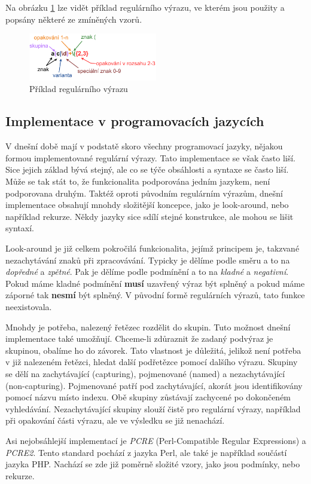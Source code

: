 Na obrázku \ref{fig:REGEXEXMP} lze vidět příklad regulárního výrazu, ve kterém jsou použity a popsány některé ze zmíněných vzorů.

\begin{figure}[!h]
	\centering
	\includegraphics[width=0.5\textwidth]{Figures/regex_exmp.pdf}
	\caption{Příklad regulárního výrazu}
	\label{fig:REGEXEXMP}
\end{figure}

\subsection*{Implementace v programovacích jazycích}\label{sec:impipl}

V dnešní době mají v podstatě skoro všechny programovací jazyky, nějakou formou implementované regulární výrazy.
Tato implementace se však často liší. 
Sice jejich základ bývá stejný, ale co se týče obsáhlosti a syntaxe se často liší.
Může se tak stát to, že funkcionalita podporována jedním jazykem, není podporovana druhým.
Taktéž oproti původním regulárním výrazům, dnešní implementace obsahují mnohdy složitější koncepce, jako je look-around, nebo například rekurze.
Někdy jazyky sice sdílí stejné konstrukce, ale mohou se lišit syntaxí.

Look-around je již celkem pokročilá funkcionalita, jejímž principem je, takzvané nezachytávání znaků při zpracovávání.
Typicky je dělíme podle směru a to na \textit{dopředné} a \textit{zpětné}.
Pak je dělíme podle podmínění a to na \textit{kladné} a \textit{negativní}.
Pokud máme kladné podmínění \textbf{musí} uzavřený výraz být splněný a pokud máme záporné tak \textbf{nesmí} být splněný.
V původní formě regulárních výrazů, tato funkce neexistovala.

Mnohdy je potřeba, nalezený řetězec rozdělit do skupin. 
Tuto možnost dnešní implementace také umožňují.
Chceme-li zdůraznit že zadaný podvýraz je skupinou, obalíme ho do závorek.
Tato vlastnost je důležitá, jelikož není potřeba v již nalezeném řetězci, hledat další podřetězce pomocí dalšího výrazu.
Skupiny se dělí na zachytávající (capturing), pojmenované (named) a nezachytávající (non-capturing).
Pojmenované patří pod zachytávající, akorát jsou identifikovány pomocí názvu místo indexu.
Obě skupiny zůstávají zachycené po dokončeném vyhledávání.
Nezachytávající skupiny slouží čistě pro regulární výrazy, například při opakování části výrazu, ale ve výsledku se již nenachází.

Asi nejobsáhlejší implementací je \textit{PCRE} (Perl-Compatible Regular Expressions) a \textit{PCRE2}.
Tento standard pochází z jazyka Perl, ale také je například součástí jazyka PHP.
Nachází se zde již poměrně složité vzory, jako jsou podmínky, nebo rekurze.

\endinput

